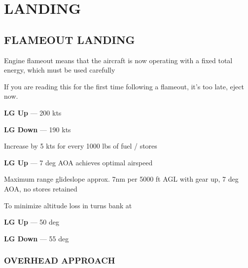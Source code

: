 \marginfigrestore

\clearpage

\section{LANDING}

\subsection{FLAMEOUT LANDING}
\label{subsec:proc_em:landing:flameout}

\begin{tcoloritemize}
    Engine flameout means that the aircraft is now operating with a fixed total energy,
    which must be used carefully

    \medskip
    If you are reading this for the first time following a flameout, 
    it's too late, eject now.

    \textbf{LG Up} --- 200 kts
    
    \medskip
    \textbf{LG Down} --- 190 kts
    
    \bigskip
    Increase by 5 kts for every 1000 lbs of fuel / stores

    \textbf{LG Up} --- 7 deg AOA achieves optimal airspeed

    \blueitem[Glideslope] Maximum range glideslope
    approx. 7nm per 5000 ft AGL with gear up,
    7 deg AOA, no stores retained

    To minimize altitude loss in turns bank at
    
    \medskip
    \textbf{LG Up} --- 50 deg

    \medskip
    \textbf{LG Down} --- 55 deg
\end{tcoloritemize}

\subsubsection{OVERHEAD APPROACH}

